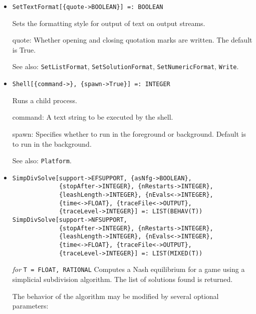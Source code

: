 \begin{itemize}
\item
\protect \large \begin{verbatim}
SetTextFormat[{quote->BOOLEAN}] =: BOOLEAN
\end{verbatim}\normalsize

\bd
Sets the formatting style for output of text on output streams.
\bd
\item [quote:] Whether opening and closing quotation marks are
written.  The default is True.  
\ed
\item [See also:] \verb+SetListFormat+, \verb+SetSolutionFormat+, 
\verb+SetNumericFormat+, \verb+Write+.
\ed

\item
\protect \large \begin{verbatim}
Shell[{command->}, {spawn->True}] =: INTEGER
\end{verbatim} \normalsize

\bd
Runs a child process.  
\bd
\item [command:] A text string to be executed by the shell.  
\item [spawn:] Specifies whether to run in the foreground or
background.  Default is to run in the background.  
\ed
\item [See also:] \verb+Platform+.
\ed

\item
\protect \large \begin{verbatim}
SimpDivSolve[support->EFSUPPORT, {asNfg->BOOLEAN}, 
             {stopAfter->INTEGER}, {nRestarts->INTEGER}, 
             {leashLength->INTEGER}, {nEvals<->INTEGER}, 
             {time<->FLOAT}, {traceFile<->OUTPUT},
             {traceLevel->INTEGER}] =: LIST(BEHAV(T))
SimpDivSolve[support->NFSUPPORT, 
             {stopAfter->INTEGER}, {nRestarts->INTEGER}, 
             {leashLength->INTEGER}, {nEvals<->INTEGER}, 
             {time<->FLOAT}, {traceFile<->OUTPUT},
             {traceLevel->INTEGER}] =: LIST(MIXED(T))
\end{verbatim}\normalsize

{\it for} {\tt T = FLOAT, RATIONAL}
\bd
Computes a Nash equilibrium for a game using a simplicial subdivision
algorithm.  The list of solutions found is returned.

The behavior of the algorithm may be modified by several optional
parameters:


\end{itemize}
